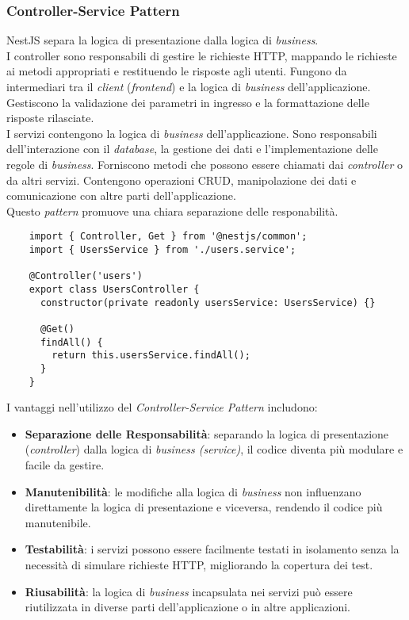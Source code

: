 \subsubsection{Controller-Service Pattern}
NestJS separa la logica di presentazione dalla logica di \textit{business}. \\
I controller sono responsabili di gestire le richieste HTTP, mappando le richieste ai metodi appropriati e restituendo le risposte agli utenti.
Fungono da intermediari tra il \textit{client} (\textit{frontend}) e la logica di \textit{business} dell'applicazione.
Gestiscono la validazione dei parametri in ingresso e la formattazione delle risposte rilasciate.\\
I servizi contengono la logica di \textit{business} dell'applicazione. 
Sono responsabili dell'interazione con il \textit{database}, la gestione dei dati e l'implementazione delle regole di \textit{business}.
Forniscono metodi che possono essere chiamati dai \textit{controller} o da altri servizi.
Contengono operazioni CRUD, manipolazione dei dati e comunicazione con altre parti dell'applicazione.\\
Questo \textit{pattern} promuove una chiara separazione delle responabilità.
\begin{lstlisting}
	import { Controller, Get } from '@nestjs/common';
	import { UsersService } from './users.service';
	
	@Controller('users')
	export class UsersController {
	  constructor(private readonly usersService: UsersService) {}
	
	  @Get()
	  findAll() {
		return this.usersService.findAll();
	  }
	}
\end{lstlisting}
I vantaggi nell'utilizzo del \textit{Controller-Service Pattern} includono:
\begin{itemize}
	\item \textbf{Separazione delle Responsabilità}: separando la logica di presentazione (\textit{controller}) dalla logica di \textit{business (service)}, il codice diventa più modulare e facile da gestire.
	\item \textbf{Manutenibilità}: le modifiche alla logica di \textit{business} non influenzano direttamente la logica di presentazione e viceversa, rendendo il codice più manutenibile.
	\item \textbf{Testabilità}: i servizi possono essere facilmente testati in isolamento senza la necessità di simulare richieste HTTP, migliorando la copertura dei test.
	\item \textbf{Riusabilità}: la logica di \textit{business} incapsulata nei servizi può essere riutilizzata in diverse parti dell'applicazione o in altre applicazioni.
\end{itemize}


